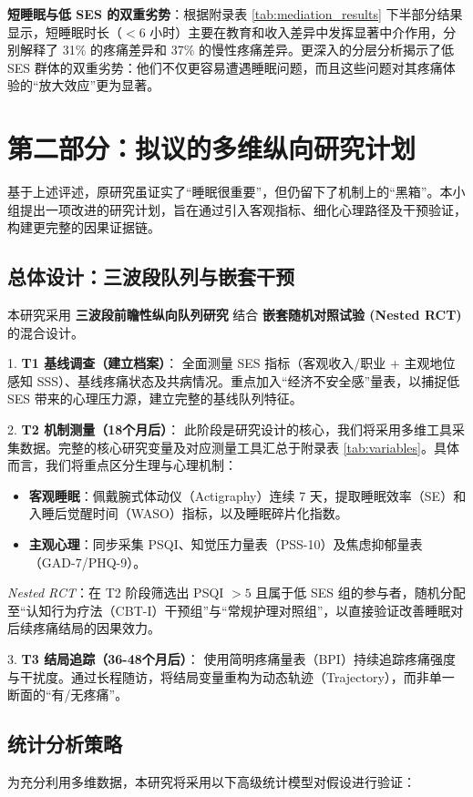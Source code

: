 \documentclass[lang=cn,a4paper,newtx,code=minted,codebg=light]{elegantpaper}
\begin{document}
\textbf{短睡眠与低 SES 的双重劣势}：根据附录表 \ref{tab:mediation_results} 下半部分结果显示，短睡眠时长（$<6$ 小时）主要在教育和收入差异中发挥显著中介作用，分别解释了 31\% 的疼痛差异和 37\% 的慢性疼痛差异。更深入的分层分析揭示了低 SES 群体的双重劣势：他们不仅更容易遭遇睡眠问题，而且这些问题对其疼痛体验的“放大效应”更为显著。

\section{第二部分：拟议的多维纵向研究计划}

基于上述评述，原研究虽证实了“睡眠很重要”，但仍留下了机制上的“黑箱”。本小组提出一项改进的研究计划，旨在通过引入客观指标、细化心理路径及干预验证，构建更完整的因果证据链。

\subsection{总体设计：三波段队列与嵌套干预}
本研究采用 \textbf{三波段前瞻性纵向队列研究} 结合 \textbf{嵌套随机对照试验 (Nested RCT)} 的混合设计。

1.  \textbf{T1 基线调查（建立档案）}：
    全面测量 SES 指标（客观收入/职业 + 主观地位感知 SSS）、基线疼痛状态及共病情况。重点加入“经济不安全感”量表，以捕捉低 SES 带来的心理压力源，建立完整的基线队列特征。

2.  \textbf{T2 机制测量（18个月后）}：
    此阶段是研究设计的核心，我们将采用多维工具采集数据。完整的核心研究变量及对应测量工具汇总于附录表 \ref{tab:variables}。具体而言，我们将重点区分生理与心理机制：
    \begin{itemize}
        \item \textbf{客观睡眠}：佩戴腕式体动仪（Actigraphy）连续 7 天，提取睡眠效率（SE）和入睡后觉醒时间（WASO）指标，以及睡眠碎片化指数。
        \item \textbf{主观心理}：同步采集 PSQI、知觉压力量表（PSS-10）及焦虑抑郁量表（GAD-7/PHQ-9）。
    \end{itemize}
    \textit{Nested RCT}：在 T2 阶段筛选出 PSQI $>5$ 且属于低 SES 组的参与者，随机分配至“认知行为疗法（CBT-I）干预组”与“常规护理对照组”，以直接验证改善睡眠对后续疼痛结局的因果效力。

3.  \textbf{T3 结局追踪（36-48个月后）}：
    使用简明疼痛量表（BPI）持续追踪疼痛强度与干扰度。通过长程随访，将结局变量重构为动态轨迹（Trajectory），而非单一断面的“有/无疼痛”。

\subsection{统计分析策略}
为充分利用多维数据，本研究将采用以下高级统计模型对假设进行验证：
\end{document}
